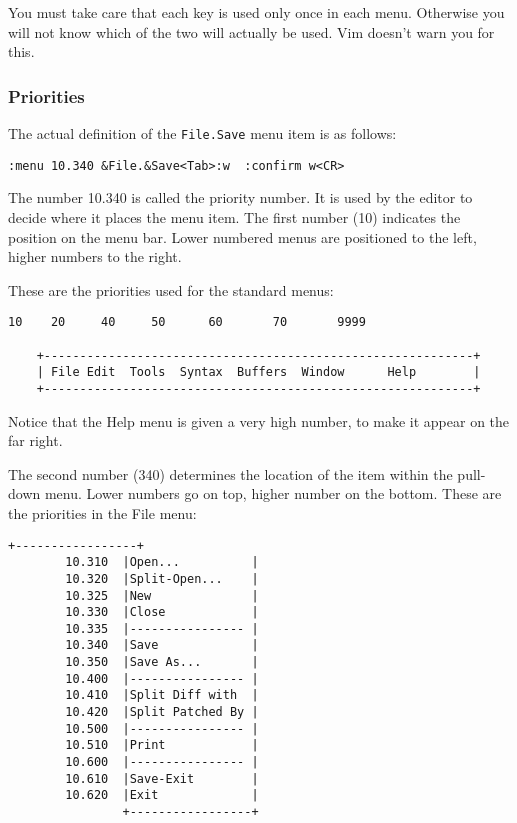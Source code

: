 You must take care that each key is used only once in each menu.
Otherwise you will not know which of the two will actually be used.
Vim doesn't warn you for this.

\subsubsection{Priorities}
The actual definition of the \verb!File.Save! menu item is as follows:

\begin{Verbatim}[samepage=true]
 :menu 10.340 &File.&Save<Tab>:w  :confirm w<CR>
\end{Verbatim}

The number 10.340 is called the priority number.
It is used by the editor to decide where it places the menu item.
The first number (10) indicates the position on the menu bar.
Lower numbered menus are positioned to the left, higher numbers to the right.

These are the priorities used for the standard menus:

\begin{Verbatim}[samepage=true]
      10    20     40     50      60       70       9999

    +------------------------------------------------------------+
    | File Edit  Tools  Syntax  Buffers  Window      Help        |
    +------------------------------------------------------------+
\end{Verbatim}

Notice that the Help menu is given a very high number, to make it appear on the far right.

The second number (340) determines the location of the item within the pull-down menu.
Lower numbers go on top, higher number on the bottom.
These are the priorities in the File menu:

\begin{Verbatim}[samepage=true]
                +-----------------+
        10.310  |Open...          |
        10.320  |Split-Open...    |
        10.325  |New              |
        10.330  |Close            |
        10.335  |---------------- |
        10.340  |Save             |
        10.350  |Save As...       |
        10.400  |---------------- |
        10.410  |Split Diff with  |
        10.420  |Split Patched By |
        10.500  |---------------- |
        10.510  |Print            |
        10.600  |---------------- |
        10.610  |Save-Exit        |
        10.620  |Exit             |
                +-----------------+
\end{Verbatim}

